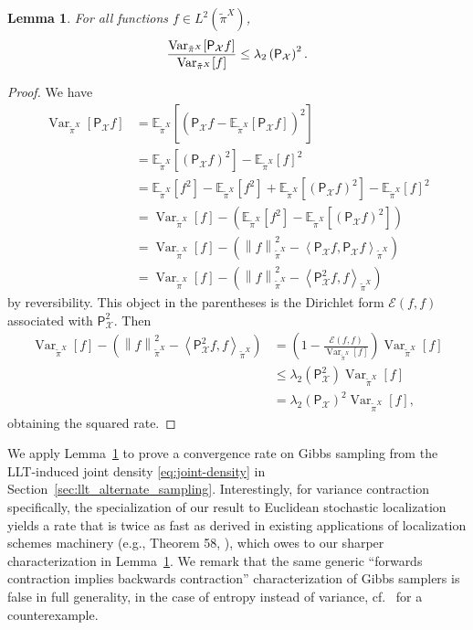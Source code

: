 \documentclass[11pt]{article}
\newtheorem{lemma}{Lemma}
\newcommand{\norm}[1]{\left\lVert#1\right\rVert}
\newcommand{\inprod}[2]{\left\langle#1, #2\right\rangle}
\newcommand{\lam}{\lambda}
\newcommand{\Var}{\textup{Var}}
\newcommand{\Par}[1]{\left(#1\right)}
\newcommand{\0}{\mathbf{0}}
\newcommand{\1}{\mathbf{1}}
\newcommand{\calX}{\mathcal{X}}
\newcommand{\sfP}{\mathsf{P}}
\newcommand{\tpi}{\tilde{\pi}}
\begin{document}
\begin{lemma}\label{lem:twice_gap}
For all functions $f \in L^2(\tpi^X)$,
\[\frac{\Var_{\tpi^X}[\sfP_{\calX} f]}{\Var_{\tpi^X}[f]} \le \lam_2\Par{\sfP_{\calX}}^2.\]
\end{lemma}
\begin{proof}
We have
\begin{align*}
    \operatorname{Var}_{\tpi^X}[\sfP_{\calX}f]
    &=\mathbb{E}_{\tpi^X}[(\sfP_{\calX}f-\mathbb{E}_{\tpi^X}[\sfP_\calX f])^2]\\
    &=\mathbb{E}_{\tpi^X}[(\sfP_\calX f)^2]-\mathbb{E}_{\tpi^X}[f]^2\\
    &=\mathbb{E}_{\tpi^X}[f^2]-\mathbb{E}_{\tpi^X}[f^2]+\mathbb{E}_{\tpi^X}[(\sfP_\calX f)^2]-\mathbb{E}_{\tpi^X}[f]^2\\
    &=\operatorname{Var}_{\tpi^X}[f]-\Par{\mathbb{E}_{\tpi^X}[f^2]-\mathbb{E}_{\tpi^X}[(\sfP_\calX f)^2]}\\
    &=\operatorname{Var}_{\tpi^X}[f]-\Par{\norm{f}_{\tpi^X}^2-\inprod{\sfP_\calX f}{\sfP_\calX f}_{\tpi^X}}\\
    &=\operatorname{Var}_{\tpi^X}[f]-\Par{\norm{f}_{\tpi^X}^2-\inprod{\sfP_\calX^2 f}{f}_{\tpi^X}}
\end{align*}
by reversibility.  This object in the parentheses is the Dirichlet form $\mathcal{E}(f, f)$ associated with $\sfP_\calX^2$.  Then 
\begin{align*}
    \operatorname{Var}_{\tpi^X}[f]-\Par{\norm{f}_{\tpi^X}^2-\inprod{\sfP_\calX^2 f}{f}_{\tpi^X}}
    &=\Par{1-\frac{\mathcal{E}(f, f)}{\operatorname{Var}_{\tpi^X}[f]}}\operatorname{Var}_{\tpi^X}[f]\\
    &\leq \lambda_2(\sfP_\calX^2)\operatorname{Var}_{\tpi^X}[f]\\
    &=\lambda_2(\sfP_\calX)^2\operatorname{Var}_{\tpi^X}[f],
\end{align*}
obtaining the squared rate.
\end{proof}

We apply Lemma~\ref{lem:twice_gap} to prove a convergence rate on Gibbs sampling from the LLT-induced joint density \eqref{eq:joint-density} in Section~\ref{sec:llt_alternate_sampling}. Interestingly, for variance contraction specifically, the specialization of our result to Euclidean stochastic localization yields a rate that is twice as fast as derived in existing applications of localization schemes machinery (e.g., Theorem 58, \cite{ChenE22}), which owes to our sharper characterization in Lemma~\ref{lem:twice_gap}. We remark that the same generic ``forwards contraction implies backwards contraction'' characterization of Gibbs samplers is false in full generality, in the case of entropy instead of variance, cf.\ \cite{CaputoCGP25} for a counterexample.
\end{document}
